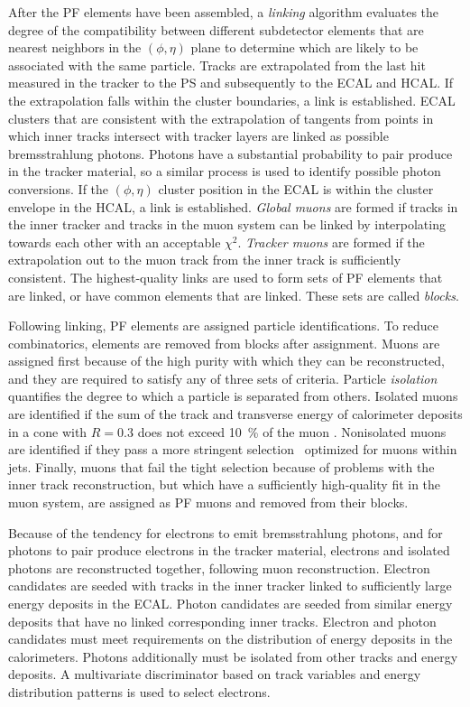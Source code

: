 After the PF elements have been assembled, a \emph{linking} algorithm evaluates
the degree of the compatibility between different subdetector elements that are
nearest neighbors in the $(\phi, \eta)$ plane to determine which are likely to
be associated with the same particle. Tracks are extrapolated from the last hit
measured in the tracker to the PS and subsequently to the ECAL and HCAL. If the
extrapolation falls within the cluster boundaries, a link is established. ECAL
clusters that are consistent with the extrapolation of tangents from points in
which inner tracks intersect with tracker layers are linked as possible
bremsstrahlung photons. Photons have a substantial probability to pair produce
in the tracker material, so a similar process is used to identify possible
photon conversions. If the $(\phi, \eta)$ cluster position in the ECAL is within
the cluster envelope in the HCAL, a link is established. \emph{Global muons} are
formed if tracks in the inner tracker and tracks in the muon system can be
linked by interpolating towards each other with an acceptable $\chi^2$.
\emph{Tracker muons} are formed if the extrapolation out to the muon track from
the inner track is sufficiently consistent. The highest-quality links are used
to form sets of PF elements that are linked, or have common elements that are
linked. These sets are called \emph{blocks}.

Following linking, PF elements are assigned particle identifications. To reduce
combinatorics, elements are removed from blocks after assignment. Muons are
assigned first because of the high purity with which they can be reconstructed,
and they are required to satisfy any of three sets of criteria. Particle
\emph{isolation} quantifies the degree to which a particle is separated from
others. Isolated muons are identified if the sum of the track \pT and transverse
energy of calorimeter deposits in a cone with $R=0.3$ does not exceed
\SI{10}{\percent} of the muon \pT. Nonisolated muons are identified if they pass
a more stringent selection~\cite{Chatrchyan:2013sba} optimized for muons within
jets. Finally, muons that fail the tight selection because of problems with the
inner track reconstruction, but which have a sufficiently high-quality fit in
the muon system, are assigned as PF muons and removed from their blocks.

Because of the tendency for electrons to emit bremsstrahlung photons, and for
photons to pair produce electrons in the tracker material, electrons and
isolated photons are reconstructed together, following muon reconstruction.
Electron candidates are seeded with tracks in the inner tracker linked to
sufficiently large energy deposits in the ECAL. Photon candidates are seeded
from similar energy deposits that have no linked corresponding inner tracks.
Electron and photon candidates must meet requirements on the distribution of
energy deposits in the calorimeters. Photons additionally must be isolated from
other tracks and energy deposits. A multivariate discriminator based on track
variables and energy distribution patterns is used to select electrons.

